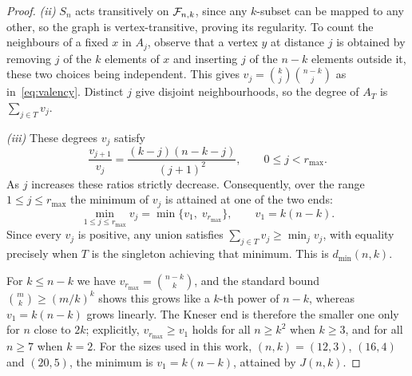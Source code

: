 \begin{proof}
\medskip \emph{(ii)} $S_n$ acts transitively on $\mathcal{F}_{n,k}$, since any $k$-subset can be mapped to any other, so the graph is vertex-transitive, proving its regularity. To count the neighbours of a fixed $x$ in $A_j$, observe that a vertex $y$ at distance $j$ is obtained by removing $j$ of the $k$ elements of $x$ and inserting $j$ of the $n-k$ elements outside it, these two choices being independent. This gives $v_j=\binom{k}{j}\binom{n-k}{j}$ as in~\eqref{eq:valency}. Distinct $j$ give disjoint neighbourhoods, so the degree of $A_T$ is $\sum_{j\in T}v_j$.

\medskip \emph{(iii)} These degrees $v_j$ satisfy
\begin{equation}
\frac{v_{j+1}}{v_j}=\frac{(k-j)(n-k-j)}{(j+1)^{2}}, \qquad 0\le j<r_{\max}.
    \label{eq:ratio}
\end{equation}
As $j$ increases these ratios strictly decrease. Consequently, over the range $1\le j\le r_{\max}$ the minimum of $v_j$ is attained at one of the two ends:
\begin{equation*}
\min_{1\le j\le r_{\max}} v_j =\min\bigl\{v_1,\;v_{r_{\max}}\bigr\}, \qquad v_1=k(n-k).
\end{equation*}
Since every $v_j$ is positive, any union satisfies $\sum_{j\in T}v_j\ge\min_j v_j$, with equality precisely when $T$ is the singleton achieving that minimum. This is $d_{\min}(n,k)$.

\medskip For $k\le n-k$ we have $v_{r_{\max}}=\binom{n-k}{k}$, and the standard bound $\binom{m}{k}\ge(m/k)^{k}$ shows this grows like a $k$-th power of $n-k$, whereas $v_1=k(n-k)$ grows linearly. The Kneser end is therefore the smaller one only for $n$ close to $2k$; explicitly, $v_{r_{\max}}\ge v_1$ holds for all $n\ge k^{2}$ when $k\ge3$, and for all $n\ge7$ when $k=2$. For the sizes used in this work, $(n,k)=(12,3)$, $(16,4)$ and $(20,5)$, the minimum is $v_1=k(n-k)$, attained by $J(n,k)$. 
\end{proof}

%

